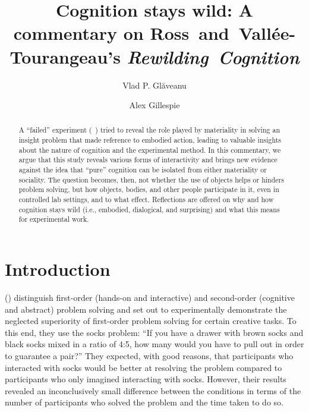 \documentclass[twocolumn, serif, reflection, authordate]{jote-article}
\title{Cognition stays wild: A commentary on Ross~and~Vallée-Tourangeau’s \textit{Rewilding~Cognition}}
\author[1,2]{Vlad P. Glăveanu}
\author[3,4]{Alex Gillespie}
\affil[1]{Webster University Geneva}
\affil[2]{University of Bergen}
\affil[3]{London School of Economics \& Political Science}
\affil[4]{Oslo New University College}
\begin{document}
    \begin{frontmatter}
    \maketitle
    \begin{abstract}
    A ``failed'' experiment (~\citeyear{Ross2021})
tried to reveal the role played by materiality in solving an insight
problem that made reference to embodied action, leading to valuable
insights about the nature of cognition and the experimental method. In
this commentary, we argue that this study reveals various forms of
interactivity and brings new evidence against the idea that ``pure''
cognition can be isolated from either materiality or sociality. The
question becomes, then, not whether the use of objects helps or hinders
problem solving, but how objects, bodies, and other people participate
in it, even in controlled lab settings, and to what effect. Reflections
are offered on why and how cognition stays wild (i.e., embodied,
dialogical, and surprising) and what this means for experimental work.
    \end{abstract}
    \end{frontmatter}


\section*{Introduction}

 (\citeyear{Ross2021}) distinguish first-order (hands-on and
interactive) and second-order (cognitive and abstract) problem solving
and set out to experimentally demonstrate the neglected superiority of
first-order problem solving for certain creative tasks. To this end,
they use the socks problem: ``If you have a drawer with brown socks and
black socks mixed in a ratio of 4:5, how many would you have to pull out
in order to guarantee a pair?'' They expected, with good reasons, that
participants who interacted with socks would be better at resolving the
problem compared to participants who only imagined interacting with
socks. However, their results revealed an inconclusively small
difference between the conditions in terms of the number of participants
who solved the problem and the time taken to do so.
\end{document}
